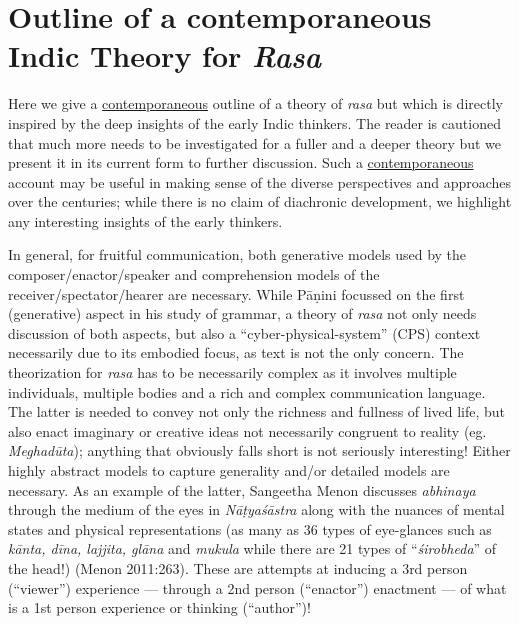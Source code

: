 \section{Outline of a contemporaneous Indic Theory for \textsl{Rasa}}\label{chap3-sec4}

Here we give a \underline{contemporaneous} outline of a theory of \textsl{rasa} but which is directly inspired by the deep insights of the early Indic thinkers. The reader is cautioned that much more needs to be investigated for a fuller and a deeper theory but we present it in its current form to further discussion. Such a \underline{contemporaneous} account may be useful in making sense of the diverse perspectives and approaches over the centuries; while there is no claim of diachronic development, we highlight any interesting insights of the early thinkers.

In general, for fruitful communication, both generative models used by the composer/enactor/speaker and comprehension models of the receiver/spectator/hearer are necessary. While Pāṇini focussed on the first (generative) aspect in his study of grammar, a theory of \textsl{rasa} not only needs discussion of both aspects, but also a “cyber-physical-system” (CPS) context necessarily due to its embodied focus, as text is not the only concern. The theorization for \textsl{rasa} has to be necessarily complex as it involves multiple individuals, multiple bodies and a rich and complex communication language. The latter is needed to convey not only the richness and fullness of lived life, but also enact imaginary or creative ideas not necessarily congruent to reality (eg. \textsl{Meghadūta}); anything that obviously falls short is not seriously interesting! Either highly abstract models to capture generality and/or detailed models are necessary. As an example of the latter, Sangeetha Menon discusses \textsl{abhinaya} through the medium of the eyes in \textsl{Nāṭyaśāstra} along with the nuances of mental states and physical representations (as many as 36 types of eye-glances such as \textsl{kānta, dīna, lajjita, glāna} and \textsl{mukula} while there are 21 types of “\textsl{śirobheda}” of the head!) (Menon 2011:263). These are attempts at inducing a 3rd person (“viewer”) experience --- through a 2nd person (“enactor”) enactment --- of what is a 1st person experience or thinking (“author”)!

